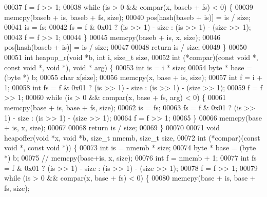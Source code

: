 \begin{DoxyCode}
00037         f = f >> 1;
00038         \textcolor{keywordflow}{while} (is > 0 && compar(x, baseb + fs) < 0) \{
00039                 memcpy(baseb + is, baseb + fs, size);
00040                 pos[hash(baseb + is)] = is / size;
00041                 is = fs;
00042                 fs = f & 0x01 ? (is >> 1) - size : (is >> 1) - (size >> 1);
00043                 f = f >> 1;
00044         \}
00045         memcpy(baseb + is, x, size);
00046         pos[hash(baseb + is)] = is / size;
00047 
00048         \textcolor{keywordflow}{return} is / size;
00049 \}
00050 
00051 \textcolor{keywordtype}{int} heapup\_r(\textcolor{keywordtype}{void} *b, \textcolor{keywordtype}{int} i, \textcolor{keywordtype}{size\_t} size,
00052                 \textcolor{keywordtype}{int} (*compar)(\textcolor{keyword}{const} \textcolor{keywordtype}{void} *, \textcolor{keyword}{const} \textcolor{keywordtype}{void} *, \textcolor{keywordtype}{void} *), \textcolor{keywordtype}{void} * arg) \{
00053         \textcolor{keywordtype}{int} is = i * size;
00054         byte * base = (byte *) b;
00055         \textcolor{keywordtype}{char} x[size];
00056         memcpy(x, base + is, size);
00057         \textcolor{keywordtype}{int} f = i + 1;
00058         \textcolor{keywordtype}{int} fs = f & 0x01 ? (is >> 1) - size : (is >> 1) - (size >> 1);
00059         f = f >> 1;
00060         \textcolor{keywordflow}{while} (is > 0 && compar(x, base + fs, arg) < 0) \{
00061                 memcpy(base + is, base + fs, size);
00062                 is = fs;
00063                 fs = f & 0x01 ? (is >> 1) - size : (is >> 1) - (size >> 1);
00064                 f = f >> 1;
00065         \}
00066         memcpy(base + is, x, size);
00067 
00068         \textcolor{keywordflow}{return} is / size;
00069 \}
00070 
00071 \textcolor{keywordtype}{void} heapoffer(\textcolor{keywordtype}{void} *x, \textcolor{keywordtype}{void} *b, \textcolor{keywordtype}{size\_t} nmemb, \textcolor{keywordtype}{size\_t} size,
00072                 \textcolor{keywordtype}{int} (*compar)(\textcolor{keyword}{const} \textcolor{keywordtype}{void} *, \textcolor{keyword}{const} \textcolor{keywordtype}{void} *)) \{
00073         \textcolor{keywordtype}{int} is = nmemb * size;
00074         byte * base = (byte *) b;
00075 \textcolor{comment}{//      memcpy(base+is, x, size);}
00076         \textcolor{keywordtype}{int} f = nmemb + 1;
00077         \textcolor{keywordtype}{int} fs = f & 0x01 ? (is >> 1) - size : (is >> 1) - (size >> 1);
00078         f = f >> 1;
00079         \textcolor{keywordflow}{while} (is > 0 && compar(x, base + fs) < 0) \{
00080                 memcpy(base + is, base + fs, size);

\end{DoxyCode}
